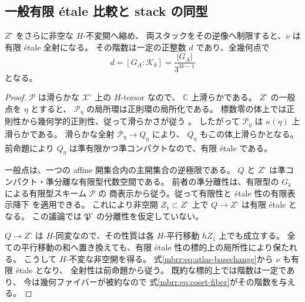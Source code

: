 \subsection{一般有限 \'etale 比較と stack の同型}

\begin{theorem}
\label{mbrr:thm:finite-etale}
$Z^\circ$ をさらに非空な $H$-不変開へ縮め、
両スタックをその逆像へ制限すると、$\nu$ は有限 \'etale 全射になる。
その階数は一定の正整数 $d$ であり、全幾何点で
\begin{equation}\label{mbrr:eq:degree}
 d=[G_A:\mathcal K_k]
   =\frac{|G_A|}{3^{3k-1}}
\end{equation}
となる。
\end{theorem}
\begin{proof}
$\mathcal P$ は滑らかな $\mathcal X^\circ$ 上の $H$-torsor なので、
$\mathbb C$ 上滑らかである。
$Z^\circ$ の一般点を $\eta$ とすると、
$\mathcal P_\eta$ の局所環は正則環の局所化である。
標数零の体上では正則性から幾何学的正則性、従って滑らかさが従う
\cite[Tags~038U, 038X]{MBGStacks}。
したがって $\mathcal P_\eta$ は $\kappa(\eta)$ 上滑らかである。
滑らかな全射 $\mathcal P_\eta\to Q_\eta$ により、
$Q_\eta$ もこの体上滑らかとなる。
前命題により $Q_\eta$ は準有限かつ準コンパクトなので、有限 \'etale である。

一般点は、一つの affine 開集合内の主開集合の逆極限である。
$Q$ と $Z^\circ$ は準コンパクト・準分離な有限型代数空間である。
前者の準分離性は、有限型の $G_k$ による有限型スキーム $\mathcal P$ の
商表示から従う。従って有限性と \'etale 性の有限表示降下
\cite[Tags~084Z, 07SL]{MBGStacks}を適用できる。
これにより非空開 $Z_1\subset Z^\circ$ 上で $Q\to Z^\circ$ は有限 \'etale となる。
この議論では $\mathfrak P^\circ$ の分離性を仮定していない。

$Q\to Z^\circ$ は $H$-同変なので、その性質は各 $H$-平行移動 $hZ_1$ 上でも成立する。
全ての平行移動の和へ置き換えても、有限 \'etale 性の標的上の局所性により保たれる。
こうして $H$-不変な非空開を得る。
式\eqref{mbrr:eq:atlas-basechange}から $\nu$ も有限 \'etale となり、
全射性は前命題から従う。
既約な標的上では階数は一定であり、
今は幾何ファイバーが被約なので
式\eqref{mbrr:eq:coset-fiber}がその階数を与える。
\end{proof}

